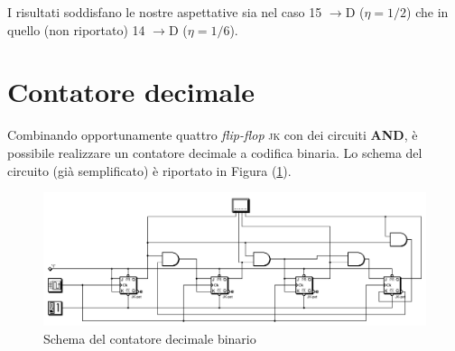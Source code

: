 \documentclass[journal, a4paper]{IEEEtran}
\begin{document}
I risultati soddisfano le nostre aspettative sia nel caso 15 $\rightarrow$D ($\eta = 1/2$) che in quello (non riportato) 14 $\rightarrow$D ($\eta = 1/6$).

\section{Contatore decimale}
Combinando opportunamente quattro \textit{flip-flop} \textsc{jk} con dei circuiti \textbf{AND}, è possibile realizzare un contatore decimale a codifica binaria. Lo schema del circuito (già semplificato) è riportato in Figura (\ref{fig:dec_counter}).\\

\begin{figure}
\centering
\includegraphics[width=0.9\linewidth]{./dec_counter}
\caption{Schema del contatore decimale binario}
\label{fig:dec_counter}
\end{figure}


%
\end{document}
